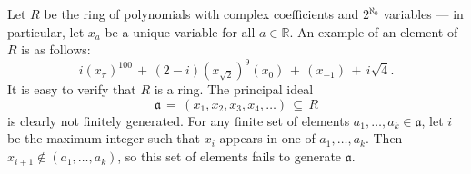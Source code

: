 \documentclass[11pt]{article}
\begin{document}
Let $R$ be the ring of polynomials with complex coefficients and $2^{\aleph_{0}}$ variables --- in particular, let $x_{a}$ be a unique variable for all $a \in \mathbb{R}$. An example of an element of $R$ is as follows:
\[
  i (x_{\pi})^{100} \, + \, (2 - i) (x_{\sqrt{2}})^{9} (x_{0}) \, + \, (x_{-1}) \, + \, i\sqrt{4}.
\]
It is easy to verify that $R$ is a ring. The principal ideal
\[
  \mathfrak{a} \, = \, (x_{1}, x_{2}, x_{3}, x_{4}, \ldots) \, \subseteq \, R
\]
is clearly not finitely generated. For any finite set of elements $a_{1}, \ldots, a_{k} \in \mathfrak{a}$, let $i$ be the maximum integer such that $x_{i}$ appears in one of $a_{1}, \ldots, a_{k}$. Then $x_{i + 1} \notin (a_{1}, \ldots, a_{k})$, so this set of elements fails to generate $\mathfrak{a}$.

\end{document}
